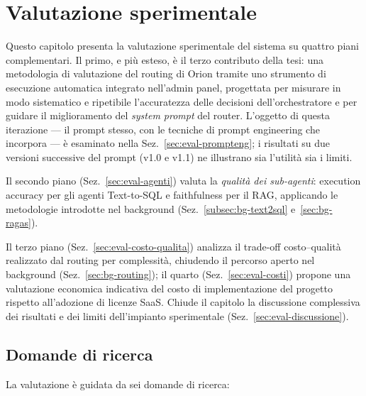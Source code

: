 
\chapter{Valutazione sperimentale}
\label{chap:orion-valutazione}

Questo capitolo presenta la valutazione sperimentale del sistema su quattro piani complementari.
Il primo, e più esteso, è il terzo contributo della tesi: una metodologia di valutazione del routing di Orion tramite uno strumento di esecuzione automatica integrato nell'admin panel,
progettata per misurare in modo sistematico e ripetibile l'accuratezza delle decisioni dell'orchestratore e per guidare il miglioramento del \emph{system prompt} del router.
L'oggetto di questa iterazione --- il prompt stesso, con le tecniche di prompt engineering che incorpora --- è esaminato nella Sez.~\ref{sec:eval-prompteng};
i risultati su due versioni successive del prompt (v1.0 e v1.1) ne illustrano sia l'utilità sia i limiti.

Il secondo piano (Sez.~\ref{sec:eval-agenti}) valuta la \emph{qualità dei sub-agenti}: execution accuracy per gli agenti Text-to-SQL e faithfulness per il RAG,
applicando le metodologie introdotte nel background (Sez.~\ref{subsec:bg-text2sql} e~\ref{sec:bg-ragas}).

Il terzo piano (Sez.~\ref{sec:eval-costo-qualita}) analizza il trade-off costo--qualità realizzato dal routing per complessità,
chiudendo il percorso aperto nel background (Sez.~\ref{sec:bg-routing}); il quarto (Sez.~\ref{sec:eval-costi}) propone una valutazione economica indicativa
del costo di implementazione del progetto rispetto all'adozione di licenze SaaS.
Chiude il capitolo la discussione complessiva dei risultati e dei limiti dell'impianto sperimentale (Sez.~\ref{sec:eval-discussione}).

\section{Domande di ricerca}
\label{sec:eval-research-questions}

La valutazione è guidata da sei domande di ricerca:

